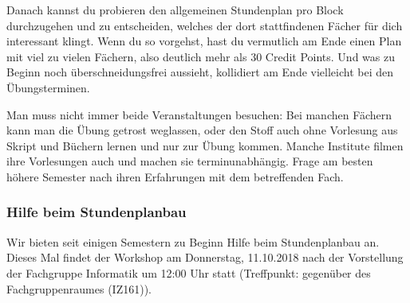 \begin{multicols}{2}
		Danach kannst du probieren den allgemeinen Stundenplan pro Block durchzugehen und zu entscheiden, welches der dort stattfindenen Fächer für dich interessant klingt. Wenn du so vorgehst, hast du vermutlich am Ende einen Plan mit viel zu vielen Fächern, also deutlich mehr als 30 Credit Points. Und was zu Beginn noch überschneidungsfrei aussieht, kollidiert am Ende vielleicht bei den Übungsterminen. 

		Man muss nicht immer beide Veranstaltungen besuchen: Bei manchen Fächern kann man die Übung getrost weglassen, oder den Stoff auch ohne Vorlesung aus Skript und Büchern lernen und nur zur Übung kommen. Manche Institute filmen ihre Vorlesungen auch und machen sie terminunabhängig. Frage am besten höhere Semester nach ihren Erfahrungen mit dem betreffenden Fach.

	\subsubsection{Hilfe beim Stundenplanbau}
		Wir bieten seit einigen Semestern zu Beginn Hilfe beim Stundenplanbau an. Dieses Mal findet der Workshop am Donnerstag, 11.10.2018 nach der Vorstellung der Fachgruppe Informatik um 12:00 Uhr statt (Treffpunkt: gegenüber des Fachgruppenraumes (IZ161)). 
\end{multicols}

